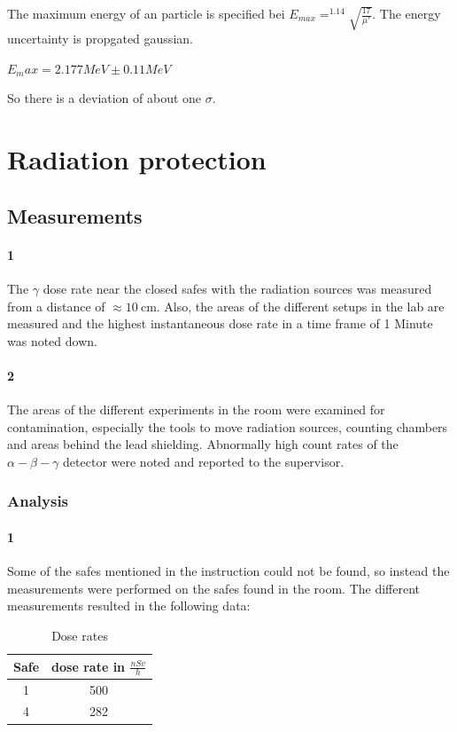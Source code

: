 \documentclass[12pt,twoside,a4paper]{scrartcl}
\begin{document}
        The maximum energy of an particle is specified bei $E_{max} = ^{1.14}\sqrt{\frac{17}{\mu'}}$.
        The energy uncertainty is propgated gaussian.

        $E_max = 2.177 MeV \pm 0.11MeV$

        So there is a deviation of about one $\sigma$.

	\section{Radiation protection}

	\subsection{Measurements}
		\paragraph{1}
		The $\gamma$ dose rate near the closed safes with the radiation sources was measured from a distance of $\approx \SI{10}{\centi \metre}$.
		Also, the areas of the different setups in the lab are measured and the highest instantaneous dose rate in a time frame of 1 Minute was noted down.

		\paragraph{2}
			The areas of the different experiments in the room were examined for contamination, especially the tools to move radiation sources, counting chambers and areas behind the lead shielding. Abnormally high count rates of the $\alpha - \beta - \gamma$ detector were noted and reported to the supervisor.

	\subsubsection{Analysis}
		\paragraph{1}

			Some of the safes mentioned in the instruction could not be found, so instead the measurements were performed on the safes found in the room.
			The different measurements resulted in the following data:

			\begin{table}[H]
				\centering
				\caption{Dose rates}
				\label{Dose::safes}
				\begin{tabular}{|c|c|}
					\hline
					Safe & dose rate in $\frac{nSv}{h}$ \\
					\hline
					1		&		500 \\
					4		&		282 \\
					\hline
				\end{tabular}
			\end{table}
\end{document}
